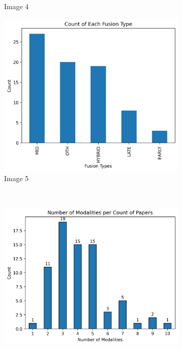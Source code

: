 \documentclass[manuscript,screen,review]{acmart}
\begin{document}
\begin{figure}[htbp]
\begin{subfigure}[b]{0.45\textwidth}
        \caption{Image 4}
    \end{subfigure}
    \begin{subfigure}[b]{0.33\textwidth}
        \includegraphics[width=\textwidth]{img/statistical_imgs/fusion_type with OTH.png}
        \caption{Image 5}
    \end{subfigure}
    \\
    \begin{subfigure}[b]{0.33\textwidth}
        \includegraphics[width=\textwidth]{img/statistical_imgs/number of modalities per count of papers.png}

\end{subfigure}
\end{figure}
\end{document}
